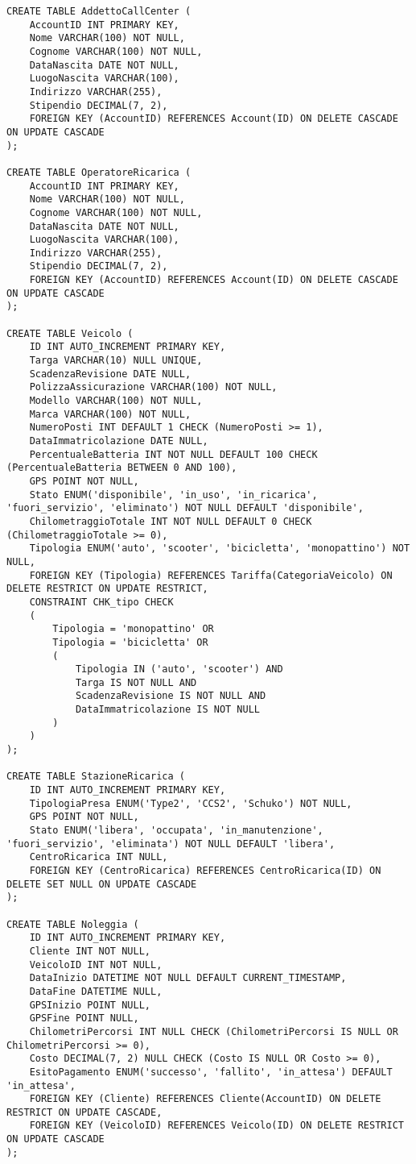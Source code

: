 \documentclass{article}
\begin{document}
\begin{lstlisting}
CREATE TABLE AddettoCallCenter (
    AccountID INT PRIMARY KEY,
    Nome VARCHAR(100) NOT NULL,
    Cognome VARCHAR(100) NOT NULL,
    DataNascita DATE NOT NULL,
    LuogoNascita VARCHAR(100),
    Indirizzo VARCHAR(255),
    Stipendio DECIMAL(7, 2),
    FOREIGN KEY (AccountID) REFERENCES Account(ID) ON DELETE CASCADE ON UPDATE CASCADE
);

CREATE TABLE OperatoreRicarica (
    AccountID INT PRIMARY KEY,
    Nome VARCHAR(100) NOT NULL,
    Cognome VARCHAR(100) NOT NULL,
    DataNascita DATE NOT NULL,
    LuogoNascita VARCHAR(100),
    Indirizzo VARCHAR(255),
    Stipendio DECIMAL(7, 2),
    FOREIGN KEY (AccountID) REFERENCES Account(ID) ON DELETE CASCADE ON UPDATE CASCADE
);

CREATE TABLE Veicolo (
    ID INT AUTO_INCREMENT PRIMARY KEY,
    Targa VARCHAR(10) NULL UNIQUE, 
    ScadenzaRevisione DATE NULL, 
    PolizzaAssicurazione VARCHAR(100) NOT NULL,
    Modello VARCHAR(100) NOT NULL,
    Marca VARCHAR(100) NOT NULL,
    NumeroPosti INT DEFAULT 1 CHECK (NumeroPosti >= 1),
    DataImmatricolazione DATE NULL,
    PercentualeBatteria INT NOT NULL DEFAULT 100 CHECK (PercentualeBatteria BETWEEN 0 AND 100),
    GPS POINT NOT NULL, 
    Stato ENUM('disponibile', 'in_uso', 'in_ricarica', 'fuori_servizio', 'eliminato') NOT NULL DEFAULT 'disponibile',
    ChilometraggioTotale INT NOT NULL DEFAULT 0 CHECK (ChilometraggioTotale >= 0),
    Tipologia ENUM('auto', 'scooter', 'bicicletta', 'monopattino') NOT NULL,
    FOREIGN KEY (Tipologia) REFERENCES Tariffa(CategoriaVeicolo) ON DELETE RESTRICT ON UPDATE RESTRICT,
    CONSTRAINT CHK_tipo CHECK 
    (
        Tipologia = 'monopattino' OR 
        Tipologia = 'bicicletta' OR 
        (
            Tipologia IN ('auto', 'scooter') AND
            Targa IS NOT NULL AND 
            ScadenzaRevisione IS NOT NULL AND
            DataImmatricolazione IS NOT NULL
        )
    )
);

CREATE TABLE StazioneRicarica (
    ID INT AUTO_INCREMENT PRIMARY KEY,
    TipologiaPresa ENUM('Type2', 'CCS2', 'Schuko') NOT NULL,
    GPS POINT NOT NULL, 
    Stato ENUM('libera', 'occupata', 'in_manutenzione', 'fuori_servizio', 'eliminata') NOT NULL DEFAULT 'libera',
    CentroRicarica INT NULL,
    FOREIGN KEY (CentroRicarica) REFERENCES CentroRicarica(ID) ON DELETE SET NULL ON UPDATE CASCADE
);

CREATE TABLE Noleggia (
    ID INT AUTO_INCREMENT PRIMARY KEY,
    Cliente INT NOT NULL,
    VeicoloID INT NOT NULL,
    DataInizio DATETIME NOT NULL DEFAULT CURRENT_TIMESTAMP,
    DataFine DATETIME NULL,
    GPSInizio POINT NULL, 
    GPSFine POINT NULL,
    ChilometriPercorsi INT NULL CHECK (ChilometriPercorsi IS NULL OR ChilometriPercorsi >= 0),
    Costo DECIMAL(7, 2) NULL CHECK (Costo IS NULL OR Costo >= 0),
    EsitoPagamento ENUM('successo', 'fallito', 'in_attesa') DEFAULT 'in_attesa',
    FOREIGN KEY (Cliente) REFERENCES Cliente(AccountID) ON DELETE RESTRICT ON UPDATE CASCADE,
    FOREIGN KEY (VeicoloID) REFERENCES Veicolo(ID) ON DELETE RESTRICT ON UPDATE CASCADE
);


\end{lstlisting}
\end{document}
